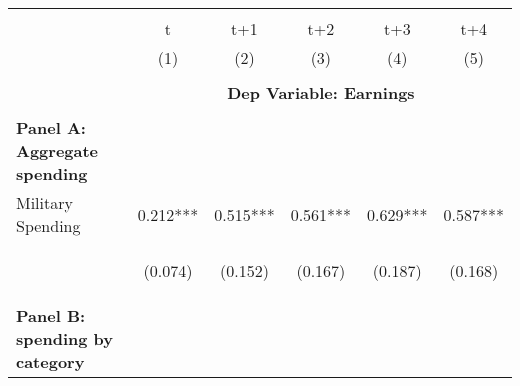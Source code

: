 
       \begin{tabular}{lccccc} \hline
    \vspace{-2pt} & \vspace{-2pt} & \vspace{-2pt} & \vspace{-2pt} & \vspace{-2pt} \\
     & t & t+1 & t+2 & t+3 & t+4 \\ 
     & (1) & (2) & (3) & (4) & (5) \\
    \hline
    \vspace{-1.5pt} & \vspace{-1.5pt} & \vspace{-1.5pt} & \vspace{-1.5pt} & \vspace{-1.5pt} \\
    &\multicolumn{5}{c}{\textbf{Dep Variable: Earnings}} \\ 
    \cmidrule{2-6}
      &  &  &  &  \\
   
    \multicolumn{1}{l}{\textbf{Panel A: Aggregate spending}} & & & & \\
    Military Spending & 0.212*** & 0.515*** & 0.561*** & 0.629*** & 0.587*** \\
    & \begin{footnotesize}(0.074)\end{footnotesize} & \begin{footnotesize}(0.152)\end{footnotesize} & \begin{footnotesize}(0.167)\end{footnotesize} & \begin{footnotesize}(0.187)\end{footnotesize} & \begin{footnotesize}(0.168)\end{footnotesize} \\
    
   \multicolumn{1}{l}{\textbf{Panel B: spending by category}} & & & & \\ 
   

\end{tabular}
